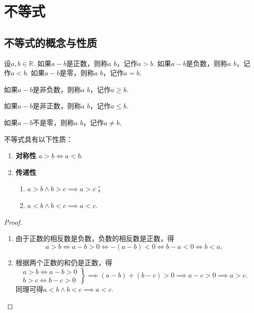 \chapter{不等式}
\section{不等式的概念与性质}
\begin{definition}
设\(a,b\in\mathbb{R}\).
如果\(a-b\)是正数，则称\(a\)  \(b\)，记作\(a>b\).
如果\(a-b\)是负数，则称\(a\)  \(b\)，记作\(a<b\).
如果\(a-b\)是零，则称\(a\)  \(b\)，记作\(a=b\).

如果\(a-b\)是非负数，则称\(a\)  \(b\)，记作\(a \geq b\).

如果\(a-b\)是非正数，则称\(a\)  \(b\)，记作\(a \leq b\).

如果\(a-b\)不是零，则称\(a\)  \(b\)，记作\(a \neq b\).
\end{definition}

\begin{property}
不等式具有以下性质：\begin{enumerate}
	\item {\bf 对称性} \(a>b \iff a<b\).

	\item {\bf 传递性} \begin{enumerate}
		\item \(a>b \land b>c \implies a>c\)；
		\item \(a<b \land b<c \implies a<c\).
	\end{enumerate}
\end{enumerate}
\begin{proof}
\begin{enumerate}
\item 由于正数的相反数是负数，负数的相反数是正数，得\[
a > b \iff a-b > 0 \iff -(a-b) < 0 \iff b-a < 0 \iff b < a.
\]
\item 根据两个正数的和仍是正数，得\[
\left. \begin{array}{c}
a > b \iff a-b > 0 \\
b > c \iff b-c > 0
\end{array} \right\}
\implies (a-b)+(b-c) > 0
\implies a-c > 0
\implies a > c.
\]同理可得\(a<b \land b<c \implies a<c\).
\qedhere
\end{enumerate}
\end{proof}
\end{property}

